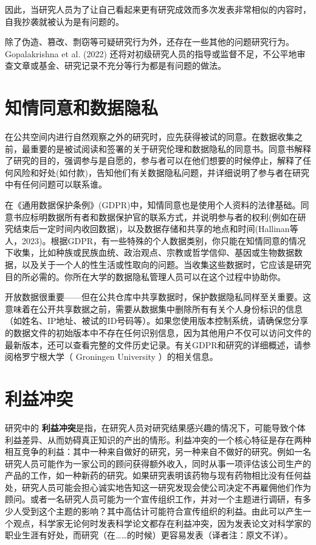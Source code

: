 \documentclass[
  letterpaper,
  DIV=11,
  numbers=noendperiod]{scrreprt}
\begin{document}
因此，当研究人员为了让自己看起来更有研究成效而多次发表非常相似的内容时，自我抄袭就被认为是有问题的。

除了伪造、篡改、剽窃等可疑研究行为外，还存在一些其他的问题研究行为。Gopalakrishna
et al. (2022)
还将对初级研究人员的指导或监督不足，不公平地审查文章或基金、研究记录不充分等行为都是有问题的做法。

\hypertarget{ux77e5ux60c5ux540cux610fux548cux6570ux636eux9690ux79c1}{%
\section{知情同意和数据隐私}\label{ux77e5ux60c5ux540cux610fux548cux6570ux636eux9690ux79c1}}

在公共空间内进行自然观察之外的研究时，应先获得被试的同意。在数据收集之前，最重要的是被试阅读和签署的关于研究伦理和数据隐私的同意书。同意书解释了研究的目的，强调参与是自愿的，参与者可以在他们想要的时候停止，解释了任何风险和好处(如付款)，告知他们有关数据隐私问题，并详细说明了参与者在研究中有任何问题可以联系谁。

在《通用数据保护条例》(GDPR)中，知情同意也是使用个人资料的法律基础。同意书应标明数据所有者和数据保护官的联系方式，并说明参与者的权利(例如在研究结束后一定时间内收回数据)，以及数据存储和共享的地点和时间(Hallinan等人，2023)。根据GDPR，有一些特殊的个人数据类别，你只能在知情同意的情况下收集，比如种族或民族血统、政治观点、宗教或哲学信仰、基因或生物数据数据，以及关于一个人的性生活或性取向的问题。当收集这些数据时，它应该是研究目的所必需的。你所在大学的数据隐私管理人员可以在这个过程中协助你。

开放数据很重要------但在公共仓库中共享数据时，保护数据隐私同样至关重要。这意味着在公开共享数据之前，需要从数据集中删除所有有关个人身份标识的信息（如姓名、IP地址、被试的ID号码等）。如果您使用版本控制系统，请确保您分享的数据文件的初始版本中不存在任何识别信息，因为其他用户不仅可以访问文件的最新版本，还可以查看完整的文件历史记录。有关GDPR和研究的详细概述，请参阅格罗宁根大学（
Groningen University ）的相关信息。

\hypertarget{ux5229ux76caux51b2ux7a81}{%
\section{利益冲突}\label{ux5229ux76caux51b2ux7a81}}

研究中的
\textbf{利益冲突}是指，在研究人员对研究结果感兴趣的情况下，可能导致个体利益差异、从而妨碍真正知识的产出的情形。利益冲突的一个核心特征是存在两种相互竞争的利益：其中一种来自做好的研究，另一种来自不做好的研究。例如一名研究人员可能作为一家公司的顾问获得额外收入，同时从事一项评估该公司生产的产品的工作，如一种新药的研究。如果研究表明该药物与现有药物相比没有任何益处，研究人员可能会担心诚实地告知这一研究发现会使公司决定不再雇佣他们作为顾问。或者一名研究人员可能为一个宣传组织工作，并对一个主题进行调研，有多少人受到这个主题的影响？其中高估计可能符合宣传组织的利益。由此可以产生一个观点，科学家无论何时发表科学论文都存在利益冲突，因为发表论文对科学家的职业生涯有好处，而研究（在\ldots\ldots 的时候）更容易发表（译者注：原文不详）。
\end{document}
